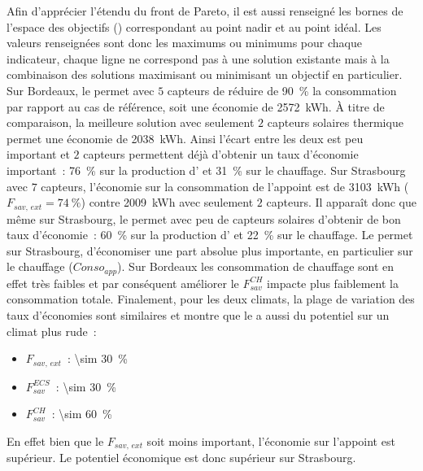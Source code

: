 Afin d’apprécier l’étendu du front de Pareto, il est aussi renseigné les bornes de
l’espace des objectifs () correspondant au point nadir
et au point idéal. Les valeurs renseignées sont donc les maximums ou minimums pour chaque
indicateur, chaque ligne ne correspond pas à une solution existante mais à la combinaison
des solutions maximisant ou minimisant un objectif en particulier.
Sur Bordeaux, le  permet avec $5$ capteurs de réduire de
\SI{90}{\percent} la consommation par rapport au cas de référence, soit une économie de
\SI{2572}{kWh}. À titre de comparaison, la meilleure solution avec
seulement $2$ capteurs solaires thermique permet une économie de \SI{2038}{kWh}. Ainsi
l’écart entre les deux est peu important et $2$ capteurs permettent déjà d’obtenir un taux
d’économie important~: \SI{76}{\percent} sur la production d’ et
\SI{31}{\percent} sur le chauffage. Sur Strasbourg avec $7$ capteurs, l’économie
sur la consommation de l’appoint  est de \SI{3103}{kWh} ($F_{sav,\, ext} = \SI{74}{\percent}$) contre
\SI{2009}{kWh} avec seulement $2$ capteurs. Il apparaît donc que même sur Strasbourg, le
 permet avec peu de capteurs solaires d’obtenir de bon taux d’économie~:
\SI{60}{\percent} sur la production d’ et \SI{22}{\percent} sur le chauffage.
Le  permet sur Strasbourg, d’économiser une part absolue plus importante, en
particulier sur le chauffage ($Conso_{app}$). Sur Bordeaux les consommation de chauffage
sont en effet très faibles et par conséquent améliorer le $F_{sav}^{CH}$ impacte plus
faiblement la consommation totale.
Finalement, pour les deux climats, la plage de variation des taux d’économies sont similaires
et montre que le  a aussi du potentiel sur un climat plus rude~:
\begin{itemize}
    \item $F_{sav,\, ext}$~: \SI{\sim 30}{\percent}
    \item $F_{sav}^{ECS}$~: \SI{\sim 30}{\percent}
    \item $F_{sav}^{CH}$~: \SI{\sim 60}{\percent}
\end{itemize}
En effet bien que le $F_{sav,\, ext}$ soit moins important, l’économie sur l’appoint
est supérieur. Le potentiel économique est donc supérieur sur Strasbourg.

